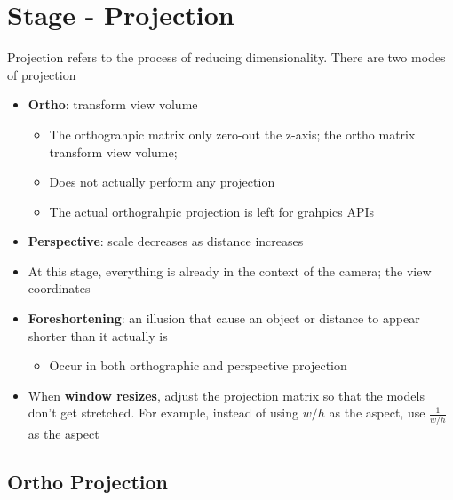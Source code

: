 \section{Stage - Projection}

Projection refers to the process of reducing dimensionality. There are two
modes of projection

\begin{itemize}
  \item \textbf{Ortho}: transform view volume
  \begin{itemize}
    \item The orthograhpic matrix only zero-out the z-axis; the ortho matrix
    transform view volume;
    \item Does not actually perform any projection
    \item The actual orthograhpic projection is left for grahpics APIs
  \end{itemize}

  \item \textbf{Perspective}: scale decreases as distance increases
  \item At this stage, everything is already in the context of the camera;
  the view coordinates
  \item \textbf{Foreshortening}: an illusion that cause an object or distance
  to appear shorter than it actually is
  \begin{itemize}
    \item Occur in both orthographic and perspective projection
  \end{itemize}

  \item When \textbf{window resizes}, adjust the projection matrix so that the
  models don't get stretched. For example, instead of using $ w / h $ as the
  aspect, use $ \frac{1}{ w / h} $ as the aspect
\end{itemize}

\subsection{Ortho Projection}

